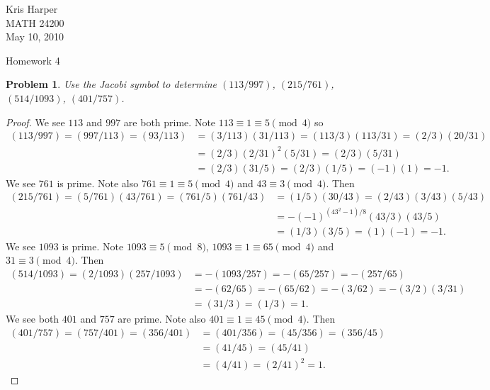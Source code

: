 \documentclass{article}
\newtheorem{problem}{Problem}
\begin{document}
\begin{flushright}
Kris Harper\\

MATH 24200\\

May 10, 2010
\end{flushright}

\begin{center}
Homework 4
\end{center}

\begin{problem}
Use the Jacobi symbol to determine $(113/997)$, $(215/761)$, $(514/1093)$, $(401/757)$.
\end{problem}
\begin{proof}
We see $113$ and $997$ are both prime. Note $113 \equiv 1 \equiv 5 \pmod{4}$ so
\begin{align*}
(113/997) = (997/113) = (93/113)
&= (3/113)(31/113) = (113/3)(113/31) = (2/3)(20/31)\\
&= (2/3)(2/31)^2(5/31) = (2/3)(5/31)\\
&= (2/3)(31/5) = (2/3)(1/5) = (-1)(1) = -1.
\end{align*}
We see $761$ is prime. Note also $761 \equiv 1 \equiv 5 \pmod{4}$ and $43 \equiv 3 \pmod{4}$. Then
\begin{align*}
(215/761) = (5/761)(43/761) = (761/5)(761/43)
&= (1/5)(30/43) = (2/43)(3/43)(5/43)\\
&= -(-1)^{(43^2-1)/8}(43/3)(43/5)\\
&= (1/3)(3/5) = (1)(-1) = -1.
\end{align*}
We see $1093$ is prime. Note $1093 \equiv 5 \pmod{8}$, $1093 \equiv 1 \equiv 65 \pmod{4}$ and $31 \equiv 3 \pmod{4}$. Then
\begin{align*}
(514/1093) = (2/1093)(257/1093)
&= -(1093/257) = -(65/257) = -(257/65)\\
&= -(62/65) = -(65/62) = -(3/62) = -(3/2)(3/31)\\
&= (31/3) = (1/3) = 1.
\end{align*}
We see both $401$ and $757$ are prime. Note also $401 \equiv 1 \equiv 45 \pmod{4}$. Then
\begin{align*}
(401/757) = (757/401) = (356/401)
&= (401/356) = (45/356) = (356/45)\\
&= (41/45) = (45/41)\\
&= (4/41) = (2/41)^2 = 1.
\end{align*}
\end{proof}
\end{document}
